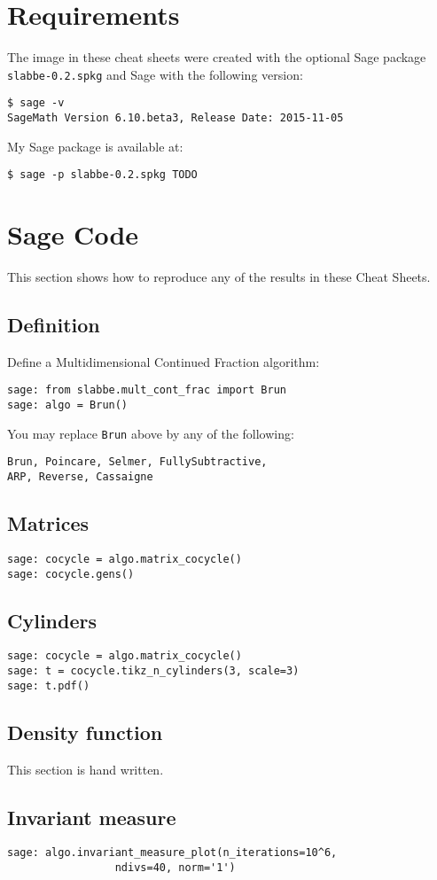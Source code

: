 \section{Requirements}
The image in these cheat sheets were created with the optional Sage package
\texttt{slabbe-0.2.spkg} and Sage with the following version:
\begin{verbatim}
$ sage -v
SageMath Version 6.10.beta3, Release Date: 2015-11-05
\end{verbatim}
My Sage package is available at:
\begin{verbatim}
$ sage -p slabbe-0.2.spkg TODO
\end{verbatim}
\section{Sage Code}
This section shows how to reproduce any of the results in these Cheat Sheets.
\subsection{Definition}
Define a Multidimensional Continued Fraction algorithm:
\begin{verbatim}
sage: from slabbe.mult_cont_frac import Brun
sage: algo = Brun()
\end{verbatim}
You may replace \texttt{Brun} above by any of the following:
\begin{verbatim}
Brun, Poincare, Selmer, FullySubtractive, 
ARP, Reverse, Cassaigne
\end{verbatim}
\subsection{Matrices}
\begin{verbatim}
sage: cocycle = algo.matrix_cocycle()
sage: cocycle.gens()
\end{verbatim}
\subsection{Cylinders}
\begin{verbatim}
sage: cocycle = algo.matrix_cocycle()
sage: t = cocycle.tikz_n_cylinders(3, scale=3)
sage: t.pdf()
\end{verbatim}
\subsection{Density function}
This section is hand written.
\subsection{Invariant measure}
\begin{verbatim}
sage: algo.invariant_measure_plot(n_iterations=10^6,
                 ndivs=40, norm='1')
\end{verbatim}
